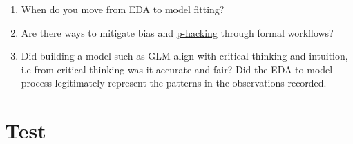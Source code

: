 \documentclass[
]{book}
\providecommand{\tightlist}{%
  \setlength{\itemsep}{0pt}\setlength{\parskip}{0pt}}
\begin{document}
\begin{enumerate}
\def\labelenumi{\arabic{enumi}.}
\tightlist
\item
  When do you move from EDA to model fitting?\\
\item
  Are there ways to mitigate bias and \href{https://www.wired.com/story/were-all-p-hacking-now/}{p-hacking} through formal workflows?\\
\item
  Did building a model such as GLM align with critical thinking and intuition, i.e from critical thinking was it accurate and fair? Did the EDA-to-model process legitimately represent the patterns in the observations recorded.
\end{enumerate}

\hypertarget{test}{%
\chapter{Test}\label{test}}

  
\end{document}

